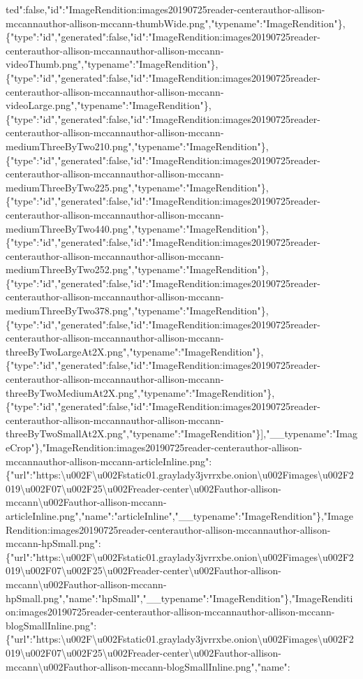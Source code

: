 ted":false,"id":"ImageRendition:images20190725reader-centerauthor-allison-mccannauthor-allison-mccann-thumbWide.png","typename":"ImageRendition"\},\{"type":"id","generated":false,"id":"ImageRendition:images20190725reader-centerauthor-allison-mccannauthor-allison-mccann-videoThumb.png","typename":"ImageRendition"\},\{"type":"id","generated":false,"id":"ImageRendition:images20190725reader-centerauthor-allison-mccannauthor-allison-mccann-videoLarge.png","typename":"ImageRendition"\},\{"type":"id","generated":false,"id":"ImageRendition:images20190725reader-centerauthor-allison-mccannauthor-allison-mccann-mediumThreeByTwo210.png","typename":"ImageRendition"\},\{"type":"id","generated":false,"id":"ImageRendition:images20190725reader-centerauthor-allison-mccannauthor-allison-mccann-mediumThreeByTwo225.png","typename":"ImageRendition"\},\{"type":"id","generated":false,"id":"ImageRendition:images20190725reader-centerauthor-allison-mccannauthor-allison-mccann-mediumThreeByTwo440.png","typename":"ImageRendition"\},\{"type":"id","generated":false,"id":"ImageRendition:images20190725reader-centerauthor-allison-mccannauthor-allison-mccann-mediumThreeByTwo252.png","typename":"ImageRendition"\},\{"type":"id","generated":false,"id":"ImageRendition:images20190725reader-centerauthor-allison-mccannauthor-allison-mccann-mediumThreeByTwo378.png","typename":"ImageRendition"\},\{"type":"id","generated":false,"id":"ImageRendition:images20190725reader-centerauthor-allison-mccannauthor-allison-mccann-threeByTwoLargeAt2X.png","typename":"ImageRendition"\},\{"type":"id","generated":false,"id":"ImageRendition:images20190725reader-centerauthor-allison-mccannauthor-allison-mccann-threeByTwoMediumAt2X.png","typename":"ImageRendition"\},\{"type":"id","generated":false,"id":"ImageRendition:images20190725reader-centerauthor-allison-mccannauthor-allison-mccann-threeByTwoSmallAt2X.png","typename":"ImageRendition"\}{]},"\_\_typename":"ImageCrop"\},"ImageRendition:images20190725reader-centerauthor-allison-mccannauthor-allison-mccann-articleInline.png":\{"url":"https:\textbackslash{}u002F\textbackslash{}u002Fstatic01.graylady3jvrrxbe.onion\textbackslash{}u002Fimages\textbackslash{}u002F2019\textbackslash{}u002F07\textbackslash{}u002F25\textbackslash{}u002Freader-center\textbackslash{}u002Fauthor-allison-mccann\textbackslash{}u002Fauthor-allison-mccann-articleInline.png","name":"articleInline","\_\_typename":"ImageRendition"\},"ImageRendition:images20190725reader-centerauthor-allison-mccannauthor-allison-mccann-hpSmall.png":\{"url":"https:\textbackslash{}u002F\textbackslash{}u002Fstatic01.graylady3jvrrxbe.onion\textbackslash{}u002Fimages\textbackslash{}u002F2019\textbackslash{}u002F07\textbackslash{}u002F25\textbackslash{}u002Freader-center\textbackslash{}u002Fauthor-allison-mccann\textbackslash{}u002Fauthor-allison-mccann-hpSmall.png","name":"hpSmall","\_\_typename":"ImageRendition"\},"ImageRendition:images20190725reader-centerauthor-allison-mccannauthor-allison-mccann-blogSmallInline.png":\{"url":"https:\textbackslash{}u002F\textbackslash{}u002Fstatic01.graylady3jvrrxbe.onion\textbackslash{}u002Fimages\textbackslash{}u002F2019\textbackslash{}u002F07\textbackslash{}u002F25\textbackslash{}u002Freader-center\textbackslash{}u002Fauthor-allison-mccann\textbackslash{}u002Fauthor-allison-mccann-blogSmallInline.png","name":